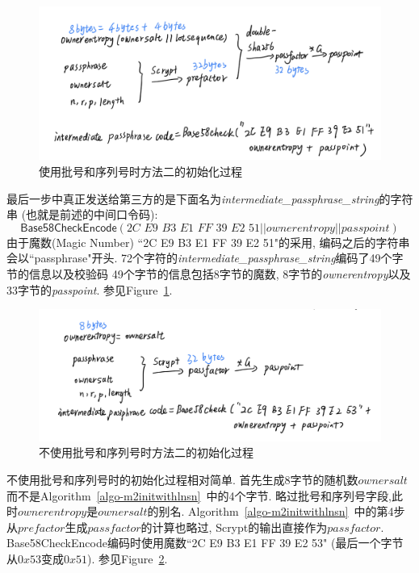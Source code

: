 \begin{figure}[h]
\centering
\includegraphics[width=.7\textwidth]{./im-code1.png}
\caption{使用批号和序列号时方法二的初始化过程}\label{fig-m2initwithlnsn}
\end{figure}
 
最后一步中真正发送给第三方的是下面名为\textit{intermediate_passphrase_string}的字符串
(也就是前述的中间口令码):
$$\textsf{Base58CheckEncode}(\textit{2C E9 B3 E1 FF 39 E2 51} || ownerentropy || passpoint)$$
由于魔数(Magic Number) ``2C E9 B3 E1 FF 39 E2 51"的采用,
编码之后的字符串会以``passphrase"开头. 
72个字符的\textit{intermediate_passphrase_string}编码了49个字节的信息以及校验码
49个字节的信息包括8字节的魔数, 8字节的\textit{ownerentropy}以及33字节的\textit{passpoint}.
参见Figure~\ref{fig-m2initwithlnsn}.
 
 
\begin{figure}[h]
\centering
\includegraphics[width=.7\textwidth]{./im-code2.png}
\caption{不使用批号和序列号时方法二的初始化过程}\label{fig-m2initnolnsn}
\end{figure}

 不使用批号和序列号时的初始化过程相对简单. 
 首先生成8字节的随机数$ownersalt$而不是Algorithm~\ref{algo-m2initwithlnsn}~中的4个字节.
 略过批号和序列号字段,此时$ownerentropy$是$ownersalt$的别名.
 Algorithm~\ref{algo-m2initwithlnsn}~中的第4步从$prefactor$生成$passfactor$的计算也略过,
 Scrypt的输出直接作为$passfactor$. 
 \textsf{Base58CheckEncode}编码时使用魔数``2C E9 B3 E1 FF 39 E2 53" (最后一个字节从$0x53$变成$0x51$).
 参见Figure~\ref{fig-m2initnolnsn}.
 

